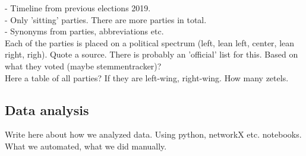 - Timeline from previous elections 2019. \\
- Only 'sitting' parties. There are more parties in total. \\
- Synonyms from parties, abbreviations etc. \\

Each of the parties is placed on a political spectrum (left, lean left, center, lean right, righ). Quote a source. There is probably an 'official' list for this. Based on what they voted (maybe stemmentracker)? \\

Here a table of all parties? If they are left-wing, right-wing. How many zetels.



\subsection{Data analysis}

Write here about how we analyzed data. Using python, networkX etc. notebooks. What we automated, what we did manually.